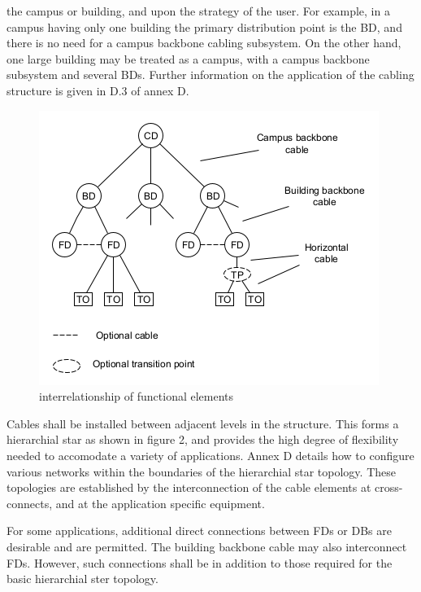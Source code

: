 the campus or building, and upon the strategy of the user. For example, in a campus having only one building the 
primary distribution point is the BD, and there is no need for a campus backbone cabling subsystem. On the other hand,
one large building may be treated as a campus, with a campus backbone subsystem and several BDs. Further information on
the application of the cabling structure is given in D.3 of annex D.
\setcounter{figure}{1}
\begin{figure}[h]
    \centering
    \begin{framed}
         \includegraphics[height=0.3\textheight]{pics/interrelationship}
        \caption{interrelationship of functional elements}
        \label{interrelationship}
    \end{framed}
\end{figure}

Cables shall be installed between adjacent levels in the structure. This forms a hierarchial star as shown in figure 2,
 and provides the high degree of flexibility needed to accomodate a variety of applications. Annex
D details how to configure various networks within the boundaries of the hierarchial star topology. These topologies are
established by the interconnection of the cable elements at cross-connects, and at the application specific equipment.\par

For some applications, additional direct connections between FDs or DBs are desirable and are permitted. The building
backbone cable may also interconnect FDs. However, such connections shall be in addition to those required for the basic
hierarchial ster topology.\par


